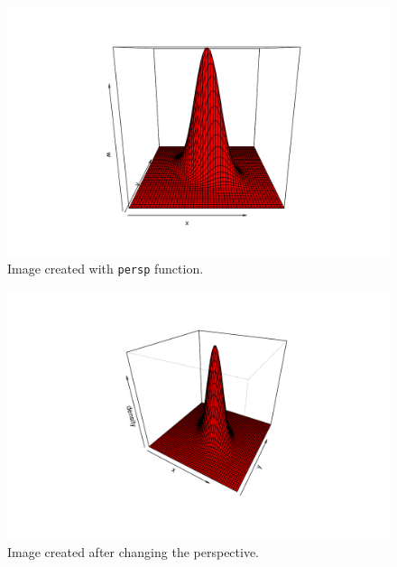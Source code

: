 \documentclass[a4paper]{article}
\begin{document}
    \begin{figure}[!htp]
        \centering
        \includegraphics[width=.6\textwidth]{img/3d-plots-func-for-new-libs-3.pdf}
        \caption*{Image created with \texttt{persp} function.}
    \end{figure}

    \begin{figure}[!htp]
        \centering
        \includegraphics[width=.6\textwidth]{img/3d-plots-func-for-new-libs-4.pdf}
        \caption*{Image created after changing the perspective.}
    \end{figure}

    \newpage
\end{document}
